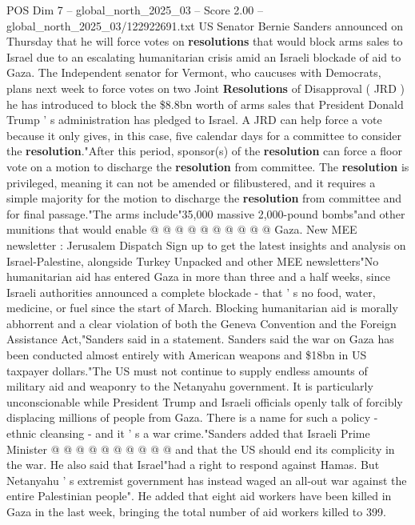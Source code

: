\begin{textsample}{POS Dim 7 – global\_north\_2025\_03 – Score 2.00 – global\_north\_2025\_03/122922691.txt}  \label{ex:f7_pos_320}
US Senator Bernie Sanders announced on Thursday that he will force votes on \textbf{resolutions} that would block arms sales to Israel due to an escalating humanitarian crisis amid an Israeli blockade of aid to Gaza.
The Independent senator for Vermont, who caucuses with Democrats, plans next week to force votes on two Joint \textbf{Resolutions} of Disapproval ( JRD ) he has introduced to block the \$8.8bn worth of arms sales that President Donald Trump ' s administration has pledged to Israel.
A JRD can help force a vote because it only gives, in this case, five calendar days for a committee to consider the \textbf{resolution}."After this period, sponsor(s) of the \textbf{resolution} can force a floor vote on a motion to discharge the \textbf{resolution} from committee.
The \textbf{resolution} is privileged, meaning it can not be amended or filibustered, and it requires a simple majority for the motion to discharge the \textbf{resolution} from committee and for final passage."The arms include"35,000 massive 2,000-pound bombs"and other munitions that would enable @ @ @ @ @ @ @ @ @ @ Gaza.
New MEE newsletter : Jerusalem Dispatch Sign up to get the latest insights and analysis on Israel-Palestine, alongside Turkey Unpacked and other MEE newsletters"No humanitarian aid has entered Gaza in more than three and a half weeks, since Israeli authorities announced a complete blockade - that ' s no food, water, medicine, or fuel since the start of March.
Blocking humanitarian aid is morally abhorrent and a clear violation of both the Geneva Convention and the Foreign Assistance Act,"Sanders said in a statement.
Sanders said the war on Gaza has been conducted almost entirely with American weapons and \$18bn in US taxpayer dollars."The US must not continue to supply endless amounts of military aid and weaponry to the Netanyahu government.
It is particularly unconscionable while President Trump and Israeli officials openly talk of forcibly displacing millions of people from Gaza.
There is a name for such a policy - ethnic cleansing - and it ' s a war crime."Sanders added that Israeli Prime Minister @ @ @ @ @ @ @ @ @ @ and that the US should end its complicity in the war.
He also said that Israel"had a right to respond against Hamas.
But Netanyahu ' s extremist government has instead waged an all-out war against the entire Palestinian people".
He added that eight aid workers have been killed in Gaza in the last week, bringing the total number of aid workers killed to 399.

\end{textsample}
